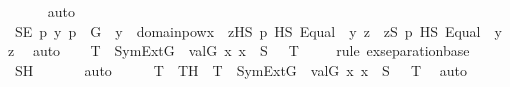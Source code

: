 \begin{isabellebody}
\ \ \ \ \isamarkupfalse%
\ auto\isanewline
\ \ \isamarkupfalse%
\ \isamarkupfalse%
\ SE{\isacharcolon}{\kern0pt}\ {\isachardoublequoteopen}{\isasymAnd}p\ y{\isachardot}{\kern0pt}\ p\ {\isasymin}\ G\ {\isasymLongrightarrow}\ y\ {\isasymin}\ domain{\isacharparenleft}{\kern0pt}powx{\isacharprime}{\kern0pt}{\isacharparenright}{\kern0pt}\ {\isasymLongrightarrow}\ {\isacharparenleft}{\kern0pt}{\isasymexists}z{\isasymin}HS{\isachardot}{\kern0pt}\ p\ {\isasymtturnstile}HS\ Equal{\isacharparenleft}{\kern0pt}{}{\isacharcomma}{\kern0pt}\ {}{\isacharparenright}{\kern0pt}\ {\isacharbrackleft}{\kern0pt}y{\isacharcomma}{\kern0pt}\ z{\isacharbrackright}{\kern0pt}{\isacharparenright}{\kern0pt}\ {\isasymlongleftrightarrow}\ {\isacharparenleft}{\kern0pt}{\isasymexists}z{\isasymin}S{\isachardot}{\kern0pt}\ p\ {\isasymtturnstile}HS\ Equal{\isacharparenleft}{\kern0pt}{}{\isacharcomma}{\kern0pt}\ {}{\isacharparenright}{\kern0pt}\ {\isacharbrackleft}{\kern0pt}y{\isacharcomma}{\kern0pt}\ z{\isacharbrackright}{\kern0pt}{\isacharparenright}{\kern0pt}{\isachardoublequoteclose}\ \isamarkupfalse%
\ auto\isanewline
\isanewline
\ \ \isamarkupfalse%
\ {\isachardoublequoteopen}{\isasymexists}T\ {\isasymin}\ SymExt{\isacharparenleft}{\kern0pt}G{\isacharparenright}{\kern0pt}{\isachardot}{\kern0pt}\ {\isacharbraceleft}{\kern0pt}\ val{\isacharparenleft}{\kern0pt}G{\isacharcomma}{\kern0pt}\ x{\isacharparenright}{\kern0pt}{\isachardot}{\kern0pt}\ x\ {\isasymin}\ S\ {\isacharbraceright}{\kern0pt}\ {\isasymsubseteq}\ T{\isachardoublequoteclose}\isanewline
\ \ \ \ \isamarkupfalse%
{\isacharparenleft}{\kern0pt}rule\ ex{\isacharunderscore}{\kern0pt}separation{\isacharunderscore}{\kern0pt}base{\isacharparenright}{\kern0pt}\isanewline
\ \ \ \ \isamarkupfalse%
\ SH\ \isanewline
\ \ \ \ \isamarkupfalse%
\ auto\isanewline
\ \ \isamarkupfalse%
\ \isamarkupfalse%
\ T\ \ TH\ {\isacharcolon}{\kern0pt}\ {\isachardoublequoteopen}T\ {\isasymin}\ SymExt{\isacharparenleft}{\kern0pt}G{\isacharparenright}{\kern0pt}{\isachardoublequoteclose}\ {\isachardoublequoteopen}{\isacharbraceleft}{\kern0pt}\ val{\isacharparenleft}{\kern0pt}G{\isacharcomma}{\kern0pt}\ x{\isacharparenright}{\kern0pt}{\isachardot}{\kern0pt}\ x\ {\isasymin}\ S\ {\isacharbraceright}{\kern0pt}\ {\isasymsubseteq}\ T{\isachardoublequoteclose}\ \isamarkupfalse%
\ auto\isanewline
\isanewline
\ \ \isamarkupfalse%

\end{isabellebody}
